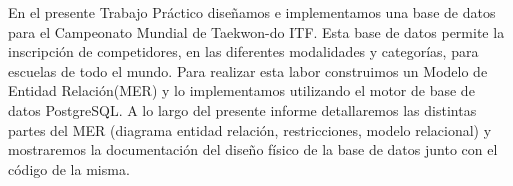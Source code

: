 En el presente Trabajo Práctico diseñamos e implementamos una base de datos para el Campeonato Mundial de Taekwon-do ITF. Esta
base de datos permite la inscripción de competidores, en las diferentes modalidades y categorías, para escuelas de todo el mundo.
Para realizar esta labor construimos un Modelo de Entidad Relación(MER) y lo implementamos utilizando el motor de base
de datos PostgreSQL. A lo largo del presente informe detallaremos las distintas partes del MER (diagrama entidad relación, restricciones,
modelo relacional) y mostraremos la documentación del diseño físico de la base de datos junto con el código de la misma.